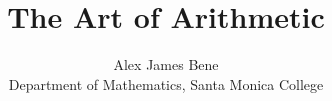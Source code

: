 \documentclass[11pt]{report}
\title{The Art of Arithmetic}
\author{Alex James Bene\\Department of Mathematics, Santa Monica College}
\date{}
\begin{document}
\maketitle





\PrintAnswers   %
\end{document}
